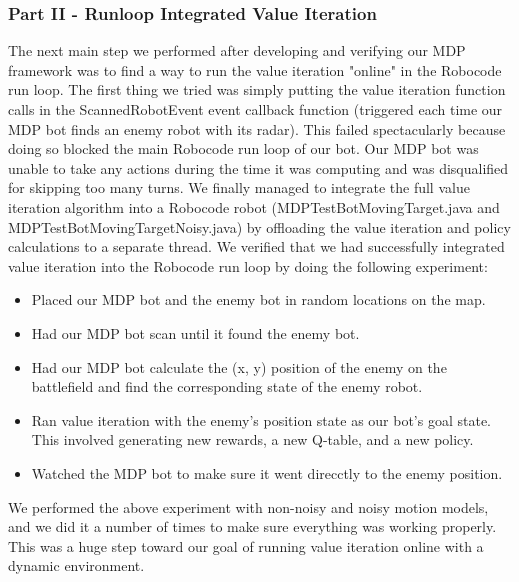 \documentclass{aiaa-tc}%
\begin{document}
\subsubsection{Part II - Runloop Integrated Value Iteration}
The next main step we performed after developing and verifying our MDP framework was to find a way to run the value iteration "online" in the Robocode run loop. The first thing we tried was simply putting the value iteration function calls in the ScannedRobotEvent event callback function (triggered each time our MDP bot finds an enemy robot with its radar). This failed spectacularly because doing so blocked the main Robocode run loop of our bot. Our MDP bot was unable to take any actions during the time it was computing and was disqualified for skipping too many turns. We finally managed to integrate the full value iteration algorithm into a Robocode robot (MDPTestBotMovingTarget.java and MDPTestBotMovingTargetNoisy.java) by offloading the value iteration and policy calculations to a separate thread. We verified that we had successfully integrated value iteration into the Robocode run loop by doing the following experiment:
\begin{itemize}
\item Placed our MDP bot and the enemy bot in random locations on the map.
\item Had our MDP bot scan until it found the enemy bot.
\item Had our MDP bot calculate the (x, y) position of the enemy on the battlefield and find the corresponding state of the enemy robot.
\item Ran value iteration with the enemy's position state as our bot's goal state. This involved generating new rewards, a new Q-table, and a new policy.
\item Watched the MDP bot to make sure it went direcctly to the enemy position.
\end{itemize}
We performed the above experiment with non-noisy and noisy motion models, and we did it a number of times to make sure everything was working properly. This was a huge step toward our goal of running value iteration online with a dynamic environment.
\end{document}
